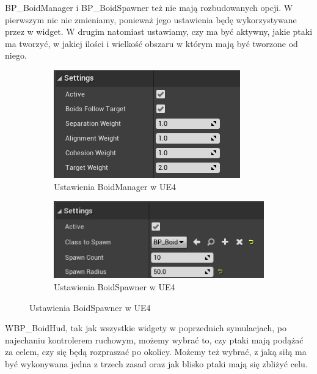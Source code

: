 \documentclass[a4paper,12pt,reqno]{article}
\begin{document}
BP\_BoidManager i BP\_BoidSpawner też nie mają rozbudowanych opcji. W pierwszym nic nie zmieniamy, ponieważ jego ustawienia będę wykorzystywane przez w widget. W drugim natomiast ustawiamy, czy ma być aktywny, jakie ptaki ma tworzyć, w jakiej ilości i wielkość obszaru w którym mają być tworzone od niego.

\begin{figure}[!ht]%
	\centering
	\begin{subfigure}{.5\textwidth}
		\centering
		\includegraphics[width=0.9\linewidth]{graphics//boids/BP_BoidManager.png}
		\caption{Ustawienia BoidManager w UE4 }	
		\label{ref:subref_a}
	\end{subfigure}%
	\begin{subfigure}{.5\textwidth}
		\centering
		\includegraphics[width=0.9\linewidth]{graphics//boids/BP_BoidSpawner.png}
		\caption{Ustawienia BoidSpawner w UE4 }
		\label{ref:subref_b}
	\end{subfigure}%
\label{ref:ref}
\end{figure}

WBP\_BoidHud, tak jak wszystkie widgety w poprzednich symulacjach, po najechaniu kontrolerem ruchowym, możemy wybrać to, czy ptaki mają podążać za celem, czy się będą rozpraszać po okolicy. Możemy też wybrać, z jaką siłą ma być wykonywana jedna z trzech zasad oraz jak blisko ptaki mają się zbliżyć celu.
\end{document}

